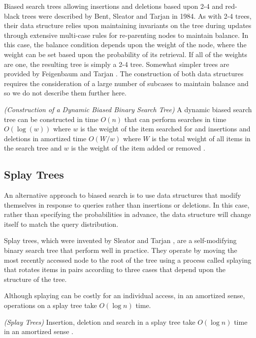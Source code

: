 \documentclass[mcs]{scsthesis}
\begin{document}
Biased search trees allowing insertions and deletions based upon 2-4 and
red-black trees were described by Bent, Sleator and Tarjan \cite{bst} in 1984.
As with 2-4 trees, their data structure relies upon maintaining invariants
on the tree during updates through extensive multi-case rules for re-parenting
nodes to maintain balance. In this case, the balance condition depends upon the
weight of the node, where the weight can be set based upon the probability of
its retrieval. If all of the weights are one, the resulting tree is simply a 2-4
tree. Somewhat simpler trees are provided by Feigenbaum and Tarjan \cite{bst2}.
The construction of both data structures requires the consideration of a large
number of subcases to maintain balance and so we do not describe them further
here.

\begin{thm} \emph{(Construction of a Dynamic Biased Binary Search Tree)} 
A dynamic biased search tree can be constructed in time \(O(n)\) that can
perform searches in time \(O(\log(w))\) where \(w\) is the weight of the item
searched for and insertions and deletions in amortized time \(O(W / w)\)
where \(W\) is the total weight of all items in the search tree and \(w\) is
the weight of the item added or removed \cite{bst2}.
\end{thm}

\subsection{Splay Trees}

An alternative approach to biased search is to use data structures that 
modify themselves in response to queries rather than insertions or deletions. In
this case, rather than specifying the probabilities in advance, the data
structure will change itself to match the query distribution. 

Splay trees, which were invented by Sleator and Tarjan \cite{splaytree}, are a
self-modifying binary search tree that perform well in practice. They operate
by moving the most recently accessed node to the root of the tree using a
process called splaying that rotates items in pairs according to three cases
that depend upon the structure of the tree.

Although splaying can be costly for an individual access, in an amortized
sense, operations on a splay tree take \(O(\log n)\) time.

\begin{thm} \emph{(Splay Trees)} 
Insertion, deletion and search in a splay tree take \(O(\log n)\) time in
an amortized sense \cite{splaytree}.
\end{thm}
\end{document}

